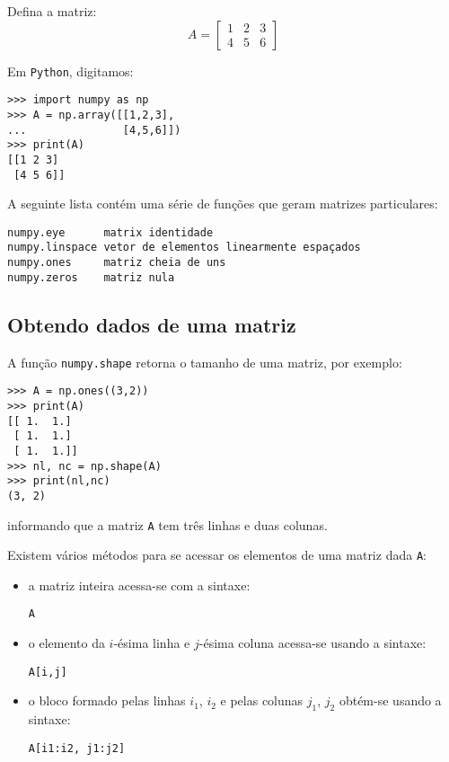 \begin{ex}
  Defina a matriz:
  \begin{equation*}
    A = \left[
      \begin{array}{ccc}
        1 & 2 & 3\\
        4 & 5 & 6
      \end{array}
\right]
  \end{equation*}
\end{ex}
\begin{sol}
  Em \verb+Python+, digitamos:
\begin{verbatim}
>>> import numpy as np
>>> A = np.array([[1,2,3],
...               [4,5,6]])
>>> print(A)
[[1 2 3]
 [4 5 6]]
\end{verbatim}
\end{sol}

A seguinte lista contém uma série de funções que geram matrizes particulares:
\begin{verbatim}
numpy.eye      matrix identidade
numpy.linspace vetor de elementos linearmente espaçados
numpy.ones     matriz cheia de uns
numpy.zeros    matriz nula
\end{verbatim}

\subsection{Obtendo dados de uma matriz}

A função \verb+numpy.shape+ retorna o tamanho de uma matriz, por exemplo:
\begin{verbatim}
>>> A = np.ones((3,2))
>>> print(A)
[[ 1.  1.]
 [ 1.  1.]
 [ 1.  1.]]
>>> nl, nc = np.shape(A)
>>> print(nl,nc)
(3, 2)
\end{verbatim}
informando que a matriz \verb+A+ tem três linhas e duas colunas.

Existem vários métodos para se acessar os elementos de uma matriz dada \verb+A+:
\begin{itemize}
\item a matriz inteira acessa-se com a sintaxe:
\begin{verbatim}
A
\end{verbatim}
\item o elemento da $i$-ésima linha e $j$-ésima coluna acessa-se usando a sintaxe:
\begin{verbatim}
A[i,j]
\end{verbatim}
\item o bloco formado pelas linhas $i_1$, $i_2$ e pelas colunas $j_1$, $j_2$ obtém-se usando a sintaxe:
\begin{verbatim}
A[i1:i2, j1:j2]
\end{verbatim}
\end{itemize}

